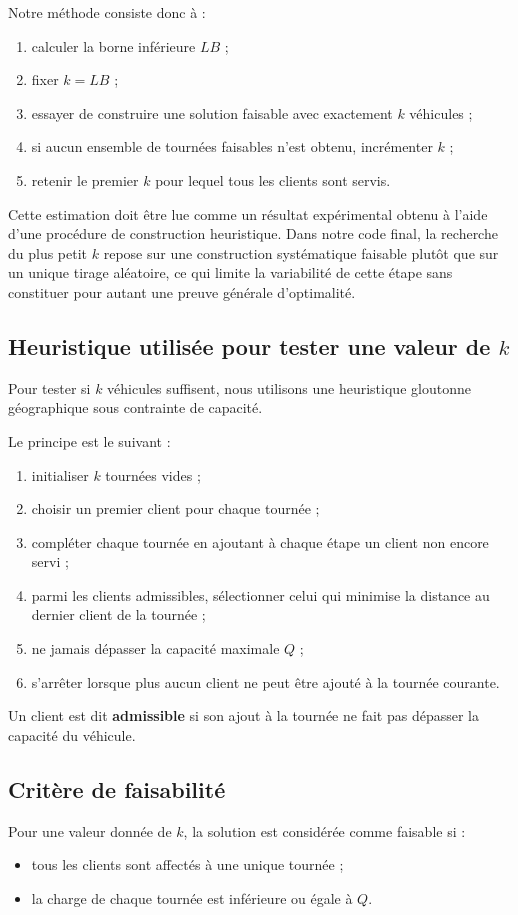 \documentclass[11pt,a4paper]{article}
\begin{document}
Notre méthode consiste donc à :
\begin{enumerate}[label=\arabic*.]
    \item calculer la borne inférieure \(LB\) ;
    \item fixer \(k = LB\) ;
    \item essayer de construire une solution faisable avec exactement \(k\) véhicules ;
    \item si aucun ensemble de tournées faisables n'est obtenu, incrémenter \(k\) ;
    \item retenir le premier \(k\) pour lequel tous les clients sont servis.
\end{enumerate}

Cette estimation doit être lue comme un résultat expérimental obtenu à l'aide d'une procédure de construction heuristique. Dans notre code final, la recherche du plus petit \(k\) repose sur une construction systématique faisable plutôt que sur un unique tirage aléatoire, ce qui limite la variabilité de cette étape sans constituer pour autant une preuve générale d'optimalité.

\subsection{Heuristique utilisée pour tester une valeur de \(k\)}
Pour tester si \(k\) véhicules suffisent, nous utilisons une heuristique gloutonne géographique sous contrainte de capacité.

Le principe est le suivant :
\begin{enumerate}[label=\arabic*.]
    \item initialiser \(k\) tournées vides ;
    \item choisir un premier client pour chaque tournée ;
    \item compléter chaque tournée en ajoutant à chaque étape un client non encore servi ;
    \item parmi les clients admissibles, sélectionner celui qui minimise la distance au dernier client de la tournée ;
    \item ne jamais dépasser la capacité maximale \(Q\) ;
    \item s'arrêter lorsque plus aucun client ne peut être ajouté à la tournée courante.
\end{enumerate}

Un client est dit \textbf{admissible} si son ajout à la tournée ne fait pas dépasser la capacité du véhicule.

\subsection{Critère de faisabilité}
Pour une valeur donnée de \(k\), la solution est considérée comme faisable si :
\begin{itemize}
    \item tous les clients sont affectés à une unique tournée ;
    \item la charge de chaque tournée est inférieure ou égale à \(Q\).
\end{itemize}
\end{document}
